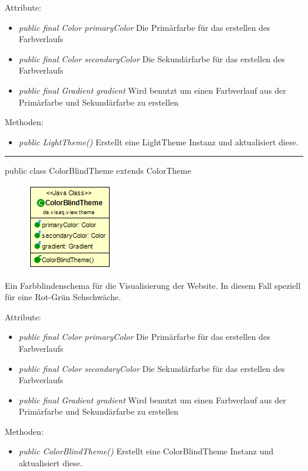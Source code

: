     Attribute:
    \begin{itemize}
        \item \emph{public final Color primaryColor} Die Primärfarbe für das erstellen des Farbverlaufs
        \item \emph{public final Color secondaryColor} Die Sekundärfarbe für das erstellen des Farbverlaufs
        \item \emph{public final Gradient gradient} Wird benutzt um einen Farbverlauf aus der Primärfarbe und Sekundärfarbe zu erstellen
    \end{itemize}
Methoden:
\begin{itemize} 
    \item \emph{public LightTheme()} Erstellt eine LightTheme Instanz und aktualisiert diese.
\end{itemize}

\rule{\textwidth}{0.4pt} 
public class ColorBlindTheme extends ColorTheme

\begin{minipage}{0.3\textwidth}
\begin{figure}[H]
    \includegraphics[scale = 0.5]{media/frontend/view/de.view.elements.theme/ColorBlindTheme_Class.png}
\end{figure}
\end{minipage} \hfill
\begin{minipage}{0.6\textwidth}
    Ein Farbblindenschema für die Visualisierung der Website. In diesem Fall speziell für eine Rot-Grün Sehschwäche.
\end{minipage}

Attribute:
\begin{itemize}
    \item \emph{public final Color primaryColor} Die Primärfarbe für das erstellen des Farbverlaufs
    \item \emph{public final Color secondaryColor} Die Sekundärfarbe für das erstellen des Farbverlaufs
    \item \emph{public final Gradient gradient} Wird benutzt um einen Farbverlauf aus der Primärfarbe und Sekundärfarbe zu erstellen
\end{itemize}
Methoden:
\begin{itemize} 
    \item \emph{public ColorBlindTheme()} Erstellt eine ColorBlindTheme Instanz und aktualisiert diese.
\end{itemize}

